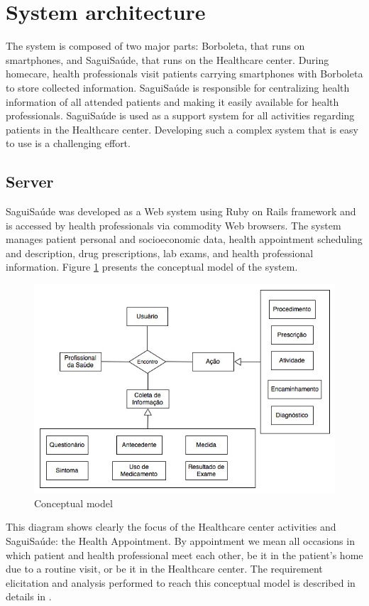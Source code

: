 \documentclass[12pt]{article}
\begin{document}
\section{System architecture}
The system is composed of two major parts: Borboleta, that runs on smartphones, and SaguiSaúde, that runs on the Healthcare center. During homecare, health professionals visit patients carrying smartphones with Borboleta to store collected information. SaguiSaúde is responsible for centralizing health information of all attended patients and making it easily available for health professionals. SaguiSaúde is used as a support system for all activities regarding patients in the Healthcare center. Developing such a complex system that is easy to use is a challenging effort.


\subsection{Server}
SaguiSaúde was developed as a Web system using Ruby on Rails framework and is accessed by health professionals via commodity Web browsers. The system manages patient personal and socioeconomic data, health appointment scheduling and description, drug prescriptions, lab exams, and health professional information. Figure \ref{dataModel} presents the conceptual model of the system.

\begin{figure}[ht]
\centering
\includegraphics[width=.60\textwidth]{images/ModeloConceitualSagui.jpg}
\caption{Conceptual model}
\label{dataModel}
\end{figure}


This diagram shows clearly the focus of the Healthcare center activities and SaguiSaúde: the Health Appointment. By appointment we mean all occasions in which patient and health professional meet each other, be it in the patient's home due to a routine visit, or be it in the Healthcare center. The requirement elicitation and analysis performed to reach this conceptual model is described in details in \cite{sagui}.
\end{document}
